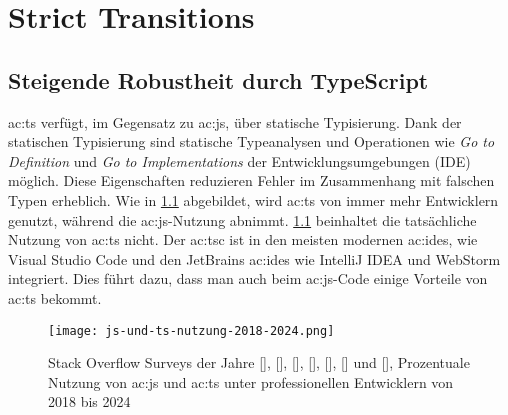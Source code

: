 \chapter{Strict Transitions} \label{ch:strict-transitions}

\section{Steigende Robustheit durch TypeScript}

\acrlong{ac:ts} verfügt, im Gegensatz zu \acrlong{ac:js}, über statische Typisierung. Dank der statischen Typisierung sind statische Typeanalysen und Operationen wie \textit{Go to Definition} und \textit{Go to Implementations} der Entwicklungsumgebungen (IDE) möglich. Diese Eigenschaften reduzieren Fehler im Zusammenhang mit falschen Typen erheblich. Wie in \ref{fig:js-und-ts-nutzung-2018-2024} abgebildet, wird \acrlong{ac:ts} von immer mehr Entwicklern genutzt, während die \acrlong{ac:js}-Nutzung abnimmt. \ref{fig:js-und-ts-nutzung-2018-2024} beinhaltet die tatsächliche Nutzung von \acrshort{ac:ts} nicht. Der \acrlong{ac:tsc} ist in den meisten modernen \acrshort{ac:ide}s, wie Visual Studio Code und den JetBrains \acrshort{ac:ide}s wie IntelliJ IDEA und WebStorm integriert. Dies führt dazu, dass man auch beim \acrlong{ac:js}-Code einige Vorteile von \acrlong{ac:ts} bekommt.\cite{typeScriptDocumentary}

\begin{figure}[H]
  \texttt{[image: js-und-ts-nutzung-2018-2024.png]}
  \caption{Stack Overflow Surveys der Jahre
  [\citeyear{stackOverflowSurvey2018MostPopularTechnologies}],
  [\citeyear{stackOverflowSurvey2019MostPopularTechnologies}],
  [\citeyear{stackOverflowSurvey2020MostPopularTechnologies}],
  [\citeyear{stackOverflowSurvey2021MostPopularTechnologies}],
  [\citeyear{stackOverflowSurvey2022MostPopularTechnologies}],
  [\citeyear{stackOverflowSurvey2023MostPopularTechnologies}] und
  [\citeyear{stackOverflowSurvey2024MostPopularTechnologies}], Prozentuale Nutzung von \acrlong{ac:js} und \acrlong{ac:ts} unter professionellen Entwicklern von 2018 bis 2024}
  \label{fig:js-und-ts-nutzung-2018-2024}
\end{figure}


